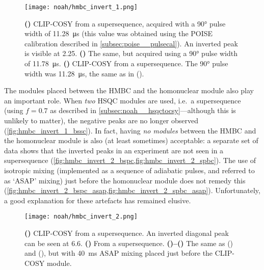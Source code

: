 \begin{figure}[htb]
    \centering
    \texttt{[image: noah/hmbc\_invert\_1.png]}%
    {\label{fig:hmbc_invert_1_orig}}%
    {\label{fig:hmbc_invert_1_pw}}%
    {\label{fig:hmbc_invert_1_bssc}}%
    \caption[Inverted peaks in homonuclear module of -type supersequences]{
        \textbf{()} CLIP-COSY from a  supersequence, acquired with a \proton{} \ang{90} pulse width of \qty{11.28}{\us} (this value was obtained using the POISE calibration described in \cref{subsec:poise__pulsecal}).
        An inverted peak is visible at \qty{2.25}{\ppm}.
        \textbf{()} The same, but acquired using a \ang{90} pulse width of \qty{11.78}{\us}.
        \textbf{()} CLIP-COSY from a  supersequence. The \ang{90} pulse width was \qty{11.28}{\us}, the same as in ().
    }
    \label{fig:hmbc_invert_1}
\end{figure}

The modules placed between the HMBC and the homonuclear module also play an important role.
When \textit{two} HSQC modules are used, i.e.\ a  supersequence (using $f = 0.7$ as described in \cref{subsec:noah__hsqctocsy}---although this is unlikely to matter), the negative peaks are no longer observed (\cref{fig:hmbc_invert_1_bssc}).
In fact, having \textit{no modules} between the HMBC and the homonuclear module is also (at least sometimes) acceptable: a separate set of data shows that the inverted peaks in an  experiment are not seen in a  supersequence (\cref{fig:hmbc_invert_2_bspc,fig:hmbc_invert_2_spbc}).
The use of isotropic mixing (implemented as a sequence of adiabatic pulses\autocite{Kupce1998JMR}, and referred to as `ASAP' mixing) just before the homonuclear module does not remedy this (\cref{fig:hmbc_invert_2_bspc_asap,fig:hmbc_invert_2_spbc_asap}).
Unfortunately, a good explanation for these artefacts has remained elusive.

\begin{figure}[!ht]
    \centering
    \texttt{[image: noah/hmbc\_invert\_2.png]}%
    {\label{fig:hmbc_invert_2_bspc}}%
    {\label{fig:hmbc_invert_2_spbc}}%
    {\label{fig:hmbc_invert_2_bspc_asap}}%
    {\label{fig:hmbc_invert_2_spbc_asap}}%
    \caption[Effect of module ordering and ASAP mixing on inverted peaks in -type supersequences]{
        \textbf{()} CLIP-COSY from a  supersequence.
        An inverted diagonal peak can be seen at \qty{6.6}{\ppm}.
        \textbf{()} From a  supersequence.
        \textbf{()--()} The same as () and (), but with \qty{40}{\ms} ASAP mixing placed just before the CLIP-COSY module.
    }
    \label{fig:hmbc_invert_2}
\end{figure}

